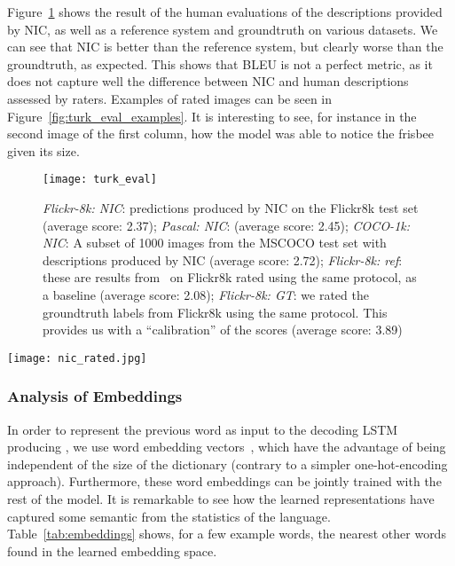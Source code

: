 Figure~\ref{fig:turk_eval_numeric} shows the result of the human evaluations
of the descriptions provided by NIC, as well as a reference system and
groundtruth on various datasets. We can see that NIC is better than the reference
system, but clearly worse than the groundtruth, as expected.
This shows that BLEU is not a perfect metric, as it does not capture well
the difference between NIC and human descriptions assessed by raters.
Examples of rated images can be seen in Figure~\ref{fig:turk_eval_examples}.
It is interesting to see, for instance in the second image of the first
column, how the model was able to notice the frisbee given its size.

\begin{figure}
\begin{center}
  \texttt{[image: turk\_eval]}
\end{center}
\vspace{-0.5cm}
\caption{\label{fig:turk_eval_numeric} {\em Flickr-8k: NIC}: predictions produced by NIC on the Flickr8k test set (average score: 2.37); {\em Pascal: NIC}: (average score: 2.45); {\em COCO-1k: NIC}: A subset of 1000 images from the MSCOCO test set with descriptions produced by NIC (average score: 2.72); {\em Flickr-8k: ref}: these are results from~\cite{hodosh2013framing} on Flickr8k rated using the same protocol, as a baseline (average score: 2.08); {\em Flickr-8k: GT}: we rated the groundtruth labels from Flickr8k using the same protocol. This provides us with a ``calibration'' of the scores (average score: 3.89)}
\end{figure}

\begin{figure*}
\begin{center}
  \texttt{[image: nic\_rated.jpg]}
\vspace{-1cm}
\end{center}
\caption{\label{fig:turk_eval_examples} A selection of evaluation results, grouped by human rating.}
\end{figure*}


\subsubsection{Analysis of Embeddings}

In order to represent the previous word  as input to the decoding LSTM
producing , we use word embedding vectors~\cite{mikolov2013},
which have the advantage of
being independent of the size of the dictionary (contrary to a simpler
one-hot-encoding approach).
Furthermore, these word embeddings can be jointly trained with the rest of the
model. It is remarkable to see how the learned representations
have captured some semantic from the statistics of the language.
Table~\ref{tab:embeddings} shows, for a few example words, the nearest other
words found in the learned embedding space.

